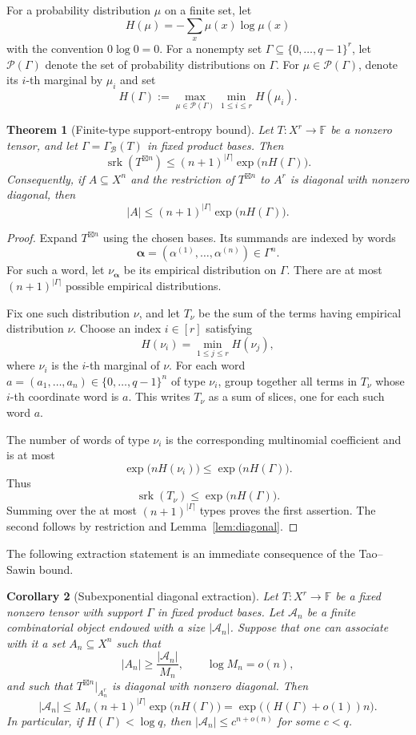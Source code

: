 \documentclass[10pt,a4paper]{amsart}
\newtheorem{theorem}{Theorem}[section]
\newtheorem{corollary}[theorem]{Corollary}
\theoremstyle{definition}
\newcommand{\F}{\mathbb F}
\newcommand{\srk}{\operatorname{srk}}
\newcommand{\boxt}{\boxtimes}
\newcommand{\1}{\mathbf 1}
\begin{document}
For a probability distribution $\mu$ on a finite set, let
\[
 H(\mu)=-\sum_x\mu(x)\log\mu(x)
\]
with the convention $0\log0=0$.  For a nonempty set $\Gamma\subseteq\{0,\ldots,q-1\}^r$, let $\mathcal P(\Gamma)$ denote the set of probability distributions on $\Gamma$.  For $\mu\in\mathcal P(\Gamma)$, denote its $i$-th marginal by $\mu_i$ and set
\[
 H(\Gamma):=
 \max_{\mu\in\mathcal P(\Gamma)}\min_{1\le i\le r}H(\mu_i).
\]

\begin{theorem}[Finite-type support-entropy bound]\label{thm:support-entropy}
Let $T:X^r\to\F$ be a nonzero tensor, and let $\Gamma=\Gamma_{\mathcal B}(T)$ in fixed product bases.  Then
\[
 \srk(T^{\boxt n})
 \le (n+1)^{|\Gamma|}\exp\bigl(nH(\Gamma)\bigr).
\]
Consequently, if $A\subseteq X^n$ and the restriction of $T^{\boxt n}$ to $A^r$ is diagonal with nonzero diagonal, then
\[
 |A|\le (n+1)^{|\Gamma|}\exp\bigl(nH(\Gamma)\bigr).
\]
\end{theorem}

\begin{proof}
Expand $T^{\boxt n}$ using the chosen bases.  Its summands are indexed by words
\[
 \boldsymbol\alpha=(\alpha^{(1)},\ldots,\alpha^{(n)})\in\Gamma^n.
\]
For such a word, let $\nu_{\boldsymbol\alpha}$ be its empirical distribution on $\Gamma$.  There are at most $(n+1)^{|\Gamma|}$ possible empirical distributions.

Fix one such distribution $\nu$, and let $T_\nu$ be the sum of the terms having empirical distribution $\nu$.  Choose an index $i\in[r]$ satisfying
\[
 H(\nu_i)=\min_{1\le j\le r}H(\nu_j),
\]
where $\nu_i$ is the $i$-th marginal of $\nu$.  For each word
$a=(a_1,\ldots,a_n)\in\{0,\ldots,q-1\}^n$ of type $\nu_i$, group together all terms in $T_\nu$ whose $i$-th coordinate word is $a$.  This writes $T_\nu$ as a sum of slices, one for each such word $a$.

The number of words of type $\nu_i$ is the corresponding multinomial coefficient and is at most
\[
 \exp\bigl(nH(\nu_i)\bigr)
 \le \exp\bigl(nH(\Gamma)\bigr).
\]
Thus
\[
 \srk(T_\nu)\le\exp\bigl(nH(\Gamma)\bigr).
\]
Summing over the at most $(n+1)^{|\Gamma|}$ types proves the first assertion.  The second follows by restriction and Lemma~\ref{lem:diagonal}.
\end{proof}
The following extraction statement is an immediate consequence of the Tao--Sawin bound.
\begin{corollary}[Subexponential diagonal extraction]\label{cor:subexp-extraction}
Let $T:X^r\to\F$ be a fixed nonzero tensor with support $\Gamma$ in fixed product bases.  Let $\mathcal A_n$ be a finite combinatorial object endowed with a size $|\mathcal A_n|$.  Suppose that one can associate with it a set $A_n\subseteq X^n$ such that
\[
 |A_n|\ge \frac{|\mathcal A_n|}{M_n},
 \qquad \log M_n=o(n),
\]
and such that $T^{\boxt n}|_{A_n^r}$ is diagonal with nonzero diagonal.  Then
\[
 |\mathcal A_n|
 \le M_n(n+1)^{|\Gamma|}\exp\bigl(nH(\Gamma)\bigr)
 =\exp\bigl((H(\Gamma)+o(1))n\bigr).
\]
In particular, if $H(\Gamma)<\log q$, then $|\mathcal A_n|\le c^{n+o(n)}$ for some $c<q$.
\end{corollary}
\end{document}
